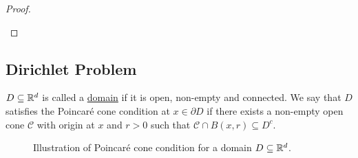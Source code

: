 \documentclass{article}
\begin{document}
\begin{proof}
\begin{enumerate}
{
    }	
    \end{enumerate}
    
\end{proof}

\subsection{Dirichlet Problem}\label{sec: Dirichlet problem}

\begin{boxdef}\label{def: poincare cone condition}

$ D\subseteq \mathbb{R}^{d}$ is called a \underline{domain} if it is open, non-empty and connected. We say that $ D$ satisfies the Poincar\'{e} cone condition at $ x\in \partial D$ if there exists a non-empty open cone $ \mathcal{C}$ with origin at $ x$ and $ r>0$ such that $ \mathcal{C}\cap B(x,r)\subseteq D^{c}$.
\end{boxdef}

\begin{figure}[H]
    \centering
    
    \caption{Illustration of Poincar\'{e} cone condition for a domain $ D\subseteq \mathbb{R}^{d}$.}
    \label{fig: poincare cone}
\end{figure}
\end{document}
